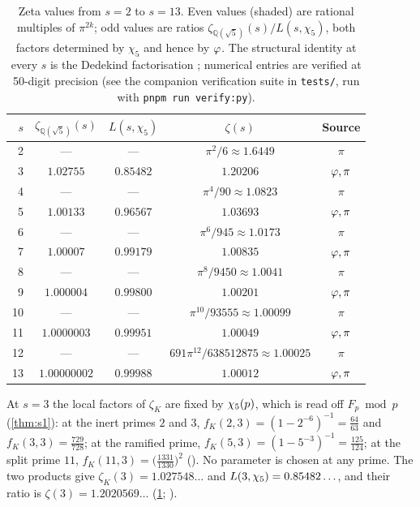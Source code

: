 \begin{table}[ht]
\centering
\caption{Zeta values from $s = 2$ to $s = 13$.  Even values (shaded)
are rational multiples of $\pi^{2k}$; odd values are ratios
$\zeta_{\mathbb{Q}(\sqrt{5})}(s)/L(s,\chi_5)$, both factors determined by
$\chi_5$ and hence by $\varphi$.  The structural identity at every $s$
is the Dedekind factorisation ; numerical
entries are verified at 50-digit precision (see the companion verification
suite in \texttt{tests/}, run with \texttt{pnpm run verify:py}).}
\label{tab:zeta-values}
\begin{tabular}{rcccc}
\toprule
$s$ & $\zeta_{\mathbb{Q}(\sqrt{5})}(s)$ & $L(s,\chi_5)$ & $\zeta(s)$ & Source \\
\midrule
\rowcolor[gray]{0.93}
 2 & --- & --- & $\pi^2/6 \approx 1.6449$ & $\pi$ \\
 3 & $1.02755$ & $0.85482$ & $1.20206$ & $\varphi,\pi$ \\
\rowcolor[gray]{0.93}
 4 & --- & --- & $\pi^4/90 \approx 1.0823$ & $\pi$ \\
 5 & $1.00133$ & $0.96567$ & $1.03693$ & $\varphi,\pi$ \\
\rowcolor[gray]{0.93}
 6 & --- & --- & $\pi^6/945 \approx 1.0173$ & $\pi$ \\
 7 & $1.00007$ & $0.99179$ & $1.00835$ & $\varphi,\pi$ \\
\rowcolor[gray]{0.93}
 8 & --- & --- & $\pi^8/9450 \approx 1.0041$ & $\pi$ \\
 9 & $1.000004$ & $0.99800$ & $1.00201$ & $\varphi,\pi$ \\
\rowcolor[gray]{0.93}
10 & --- & --- & $\pi^{10}/93555 \approx 1.00099$ & $\pi$ \\
11 & $1.0000003$ & $0.99951$ & $1.00049$ & $\varphi,\pi$ \\
\rowcolor[gray]{0.93}
12 & --- & --- & $691\pi^{12}/638512875 \approx 1.00025$ & $\pi$ \\
13 & $1.00000002$ & $0.99988$ & $1.00012$ & $\varphi,\pi$ \\
\bottomrule
\end{tabular}
\end{table}

\begin{example}\label{ex:zeta3}
At $s=3$ the local factors of $\zeta_K$ are fixed by $\chi_5(p)$, which is read off $F_p\bmod p$
(\cref{thm:s1}): at the inert primes $2$ and $3$, $f_K(2,3)=(1-2^{-6})^{-1}=\tfrac{64}{63}$ and
$f_K(3,3)=\tfrac{729}{728}$; at the ramified prime, $f_K(5,3)=(1-5^{-3})^{-1}=\tfrac{125}{124}$; at the split
prime $11$, $f_K(11,3)=\bigl(\tfrac{1331}{1330}\bigr)^2$ ().  No parameter is chosen at any prime.  The two products give $\zeta_K(3)=1.027548\ldots$ and
$L(3,\chi_5)=0.85482\ldots$, and their ratio is $\zeta(3)=1.2020569\ldots$ (\cref{tab:zeta-values};
).
\end{example}

